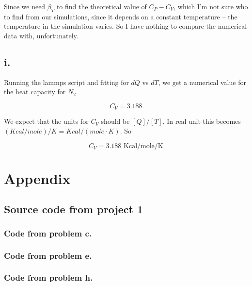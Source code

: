 \documentclass{article}
\begin{document}
Since we need $\beta_T$ to find the theoretical value of $C_P - C_V$, which I'm not sure who to find from our simulations, since it depends on a constant temperature -- the temperature in the simulation varies. So I have nothing to compare the numerical data with, unfortunately.

\subsection*{i.}
Running the lammps script and fitting for $dQ$ vs $dT$, we get a numerical value for the heat capacity for $N_2$

\begin{equation}
C_V = 3.188
\end{equation}

We expect that the units for $C_V$ should be $[Q]/[T]$. In real unit this becomes $(Kcal/mole)/K = Kcal/(mole\cdot K)$. So

\begin{equation}
C_V = 3.188 \text{ Kcal/mole/K}
\end{equation}


\section*{Appendix}

\subsection*{Source code from project 1}

\subsubsection*{Code from problem c.}

\hypertarget{code_problem_c}{}



\subsubsection*{Code from problem e.}

\hypertarget{code_problem_e}{}



\subsubsection*{Code from problem h.}
\end{document}
